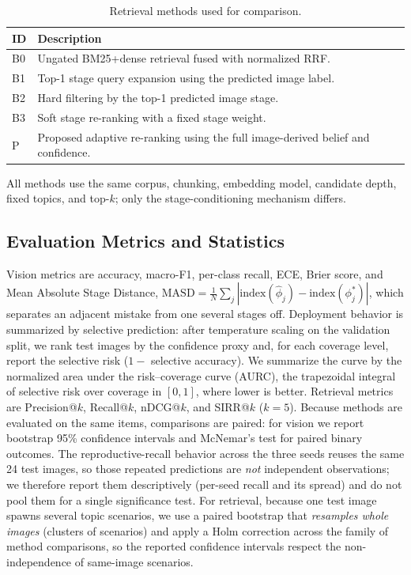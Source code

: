 \documentclass[conference]{IEEEtran}
\begin{document}
\begin{table}[t]
\centering
\caption{Retrieval methods used for comparison.}
\label{tab:baselines}
\small
\begin{tabular}{lp{}}
\toprule
\textbf{ID} & \textbf{Description} \\
\midrule
B0 & Ungated BM25+dense retrieval fused with normalized RRF. \\
B1 & Top-1 stage query expansion using the predicted image label. \\
B2 & Hard filtering by the top-1 predicted image stage. \\
B3 & Soft stage re-ranking with a fixed stage weight. \\
P & Proposed adaptive re-ranking using the full image-derived belief and confidence. \\
\bottomrule
\end{tabular}
\end{table}

All methods use the same corpus, chunking, embedding model, candidate depth, fixed topics, and top-$k$; only the stage-conditioning mechanism differs.

\subsection{Evaluation Metrics and Statistics}

Vision metrics are accuracy, macro-F1, per-class recall, ECE, Brier score, and Mean Absolute Stage Distance, $\mathrm{MASD}=\frac{1}{N}\sum_j|\mathrm{index}(\hat{\phi}_j)-\mathrm{index}(\phi_j^*)|$, which separates an adjacent mistake from one several stages off. Deployment behavior is summarized by selective prediction: after temperature scaling on the validation split, we rank test images by the confidence proxy and, for each coverage level, report the selective risk ($1-$ selective accuracy). We summarize the curve by the normalized area under the risk--coverage curve (AURC), the trapezoidal integral of selective risk over coverage in $[0,1]$, where lower is better. Retrieval metrics are Precision@$k$, Recall@$k$, nDCG@$k$, and SIRR@$k$ ($k=5$). Because methods are evaluated on the same items, comparisons are paired: for vision we report bootstrap 95\% confidence intervals \cite{efron1993bootstrap} and McNemar's test \cite{mcnemar1947note} for paired binary outcomes. The reproductive-recall behavior across the three seeds reuses the same 24 test images, so those repeated predictions are \emph{not} independent observations; we therefore report them descriptively (per-seed recall and its spread) and do not pool them for a single significance test. For retrieval, because one test image spawns several topic scenarios, we use a paired bootstrap that \emph{resamples whole images} (clusters of scenarios) and apply a Holm correction across the family of method comparisons, so the reported confidence intervals respect the non-independence of same-image scenarios.
\end{document}
